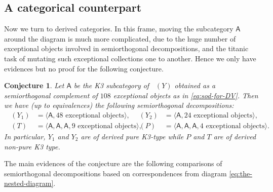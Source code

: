 \documentclass[JEP,XML,SOM,Unicode,NoEqCountersInSection]{cedram}
\theoremstyle{plain}
\newtheorem{conjecture}[theorem]{Conjecture}
\theoremstyle{definition}
\newcommand{\cat}[1]{\mathsf{#1}}
\newcommand{\sod}[1]{\langle #1 \rangle}
\DeclareMathOperator{\Db}{{\cat{D}^{\mathrm{b}}}}
\begin{document}
\subsection{A categorical counterpart}
Now we turn to derived categories. In this frame, moving the subcategory $\cat{A}$ around the diagram is much more complicated, due to the huge number of exceptional objects involved in semiorthogonal decompositions, and the titanic task of mutating such exceptional collections one to another. Hence we only have evidences but no proof for the following conjecture.

\begin{conjecture}\label{conj:decompositions}
Let $\cat{A}$ be the K3 subcategory of $\Db(Y)$ obtained as a semiorthogonal complement of $108$ exceptional objects as in \eqref{eq:sod-for-DV}.
Then we have (up to equivalences) the following semiorthogonal decompositions:\vspace*{-3pt}
\begin{align*}
\Db(Y_1)&=\sod{\cat{A}, 48 \text{ exceptional objects}},&
\Db(Y_2)&=\sod{\cat{A}, 24 \text{ exceptional objects}},\\
\Db(T)&=\sod{\cat{A},\cat{A},\cat{A}, 9 \text{ exceptional objects}},&
\Db(P)&=\sod{\cat{A},\cat{A},\cat{A}, 4 \text{ exceptional objects}}.
\end{align*}
In particular, $Y_1$ and $Y_2$ are of derived pure K3-type while $P$ and $T$ are of
derived non-pure K3 type.
\end{conjecture}

The main evidences of the conjecture are the following comparisons of semiorthogonal
decompositions based on correspondences from diagram \eqref{eq:the-nested-diagram}.
\end{document}
